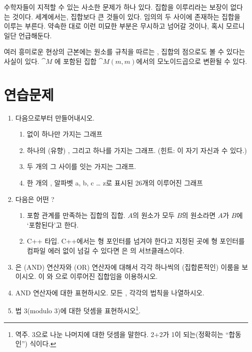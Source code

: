 \noindent
수학자들이 지적할 수 있는 사소한 문제가 하나 있다.  집합을 이루리라는 보장이 없다는 것이다.
 세계에서는, 집합보다 큰 것들이 있다. 임의의 두 \trObject 사이에 존재하는 \trMorphism\이 집합을 이루는 \trCategory\는  부른다.
약속한 대로 이런 미묘한 부분은 무시하고 넘어갈 것이나, 혹시 모르니 일단 언급해둔다.

 여러 흥미로운 현상의 근본에는  원소를  규칙을 따르는 \trMorphism{}, 집합의 점으로도 볼 수 있다는 사실이 있다.
$\cat{M}$ 에 포함된  \trComposition\은 집합 $\cat{M}(m, m)$에서의 모노이드곱으로 변환될 수 있다.

\section{연습문제}

\begin{enumerate}
\tightlist
\item
  다음으로부터 \trFreeCategory\를 만들어내시오.  

  \begin{enumerate}
  \tightlist
  \item
    \trEdge 없이 \trNode 하나만 가지는 그래프
  \item
    하나의 (유향) \trEdge, 그리고 \trNode 하나를 가지는 그래프.
    (힌트: 이 \trEdge\은 자기 자신과  수 있다.)
  \item
    두 개의 \trNode\과 그 사이를 잇는 \trArrow\를 가지는 그래프.
  \item
    한 개의 \trNode\과, 알파벳 a, b, c \ldots{} z로 표시된 26개의 \trArrow\로 이루어진 그래프
  \end{enumerate}
\item
  다음은 어떤 ?

  \begin{enumerate}
  \tightlist
  \item
    포함 관계를 만족하는 집합의 집합. $A$의 원소가 모두 $B$의 원소라면 $A$가 $B$에 `포함된다'고 한다. 
  \item
    C++ 타입. C++에서는 형 포인터를 넘겨야 한다고 지정된 곳에 형 포인터를 컴파일 에러 없이 넘길 수 있다면 
    은 의 서브클래스이다.
  \end{enumerate}
\item
  은 \code{\&\&} (AND) 연산자와 \code{||} (OR) 연산자에 대해서 각각 하나씩의 (집합론적인) \trMonoid\를 이룸을 보이시오.
  이 와 으로 이루어진 집합임을 이용하시오.
\item
  AND 연산자에 대한  \trMonoid\를 \trCategory\로 표현하시오. 모든 \trMorphism, 각각의 \trComposition 법칙을 나열하시오.
\item
  법 3(modulo 3)에 대한 덧셈을 \trMonoid \trCategory\로 표현하시오\footnote{역주. 3으로 나눈 나머지에 대한 덧셈을 말한다. 2+2가 1이 되는(정확히는 ``합동인'') 식이다. }. 
\end{enumerate}